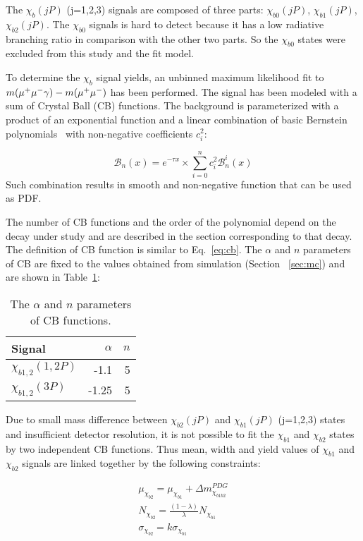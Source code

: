 The $\chi_b(jP)$ (j=1,2,3) signals are composed of three parts: $\chi_{b0}(jP)$,
$\chi_{b1}(jP)$, $\chi_{b2}(jP)$. The $\chi_{b0}$ signals is hard to detect
because it has a low radiative branching ratio in comparison with the other two
parts. So the $\chi_{b0}$ states were excluded from this study and the fit
model.

To determine the $\chi_b$ signal yields, an unbinned maximum likelihood fit to
$m(\mu^+\mu^-\gamma) - m(\mu^+\mu^-)$ has been performed. The signal has been modeled with
a sum of Crystal Ball (CB)  functions. The background is parameterized with a
product of an exponential function and a linear combination of basic Bernstein
polynomials~\cite{Phillips:2003} with non-negative coefficients $c_{i}^2$:

\begin{equation}
\label{eq:bernstein}
{\mathscr B}_{n}(x) = e^{-\tau x} \times \sum_{i=0}^{n} c_{i}^2 {\mathscr B}_{n}^{i}(x)
\end{equation}
Such combination results in smooth and non-negative function that can be used as
PDF.


The number of CB functions and the order of the polynomial depend on the decay
under study and are described in the section corresponding to that decay. The
definition of CB function is similar to Eq.~\ref{eq:cb}. The $\alpha$ and $n$
parameters of CB are fixed to the values obtained from simulation (Section ~\ref{sec:mc})
and are shown in Table~\ref{tab:chib:fit:tail}:


\begin{table}[H]
\caption{\small   The $\alpha$ and $n$ parameters of CB functions.}
\centering
\begin{tabular}{lrr}
\toprule
Signal & $\alpha$ & $n$ \\
\midrule
$\chi_{b1,2}(1,2P)$ & -1.1 & 5 \\
$\chi_{b1,2}(3P)$ & -1.25 & 5 \\
\bottomrule
\end{tabular}
\label{tab:chib:fit:tail}
\end{table}

Due to small mass difference between $\chi_{b2}(jP)$ and $\chi_{b1}(jP)$ (j=1,2,3) 
states and insufficient detector resolution, it is not possible 
to fit the $\chi_{b1}$ and $\chi_{b2}$ states by two independent CB functions. Thus mean,
width and yield values of  $\chi_{b1}$ and $\chi_{b2}$ signals are linked
together by the following constraints:

\begin{equation}
  \begin{aligned}
\mu_{\chi_{b2}} = \mu_{\chi_{b1}} + \Delta m_{\chi_{b1b2}}^{PDG} \\
N_{\chi_{b2}} = \frac{(1-\lambda)}{\lambda} N_{\chi_{b1}} \\
\sigma_{\chi_{b2}} = k \sigma_{\chi_{b1}}
  \end{aligned}
\end{equation}

